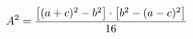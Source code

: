 \documentclass[preview]{standalone}
\begin{document}
\begin{align*}
\special{dvisvgm:raw <g id='unique000'>}A^2 = \frac{\bigl[(a+c)^2-b^2\bigr]\cdot\bigl[b^2-(a-c)^2\bigr]}{16}\special{dvisvgm:raw </g>}
\end{align*}
\end{document}
